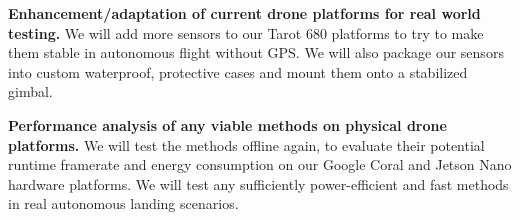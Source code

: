 \textbf{Enhancement/adaptation of current drone platforms for real world testing.}
We will add more sensors to our Tarot 680 platforms to try to make them stable in autonomous flight without GPS.
We will also package our sensors into custom waterproof, protective cases and mount them onto a stabilized gimbal.

\textbf{Performance analysis of any viable methods on physical drone platforms.}
We will test the methods offline again, to evaluate their potential runtime framerate and energy consumption
on our Google Coral and Jetson Nano hardware platforms.
We will test any sufficiently power-efficient and fast methods in real autonomous landing scenarios.